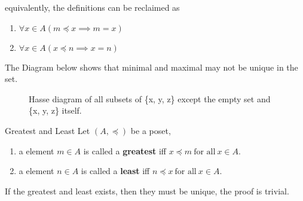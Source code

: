 \begin{remarks}
    equivalently, the definitions can be reclaimed as
    \begin{enumerate}

        \item $\forall x \in A (m \preceq x \implies m = x)$
        \item $\forall x \in A (x \preceq n \implies x = n)$

    \end{enumerate}
\end{remarks}

\begin{examples}
    The Diagram below shows that minimal and maximal may not be
    unique in the set.
\end{examples}

\begin{figure}[ht]
    \centering
    \caption{Hasse diagram of all subsets of \{x, y, z\} except the
    empty set and \{x, y, z\} itself.}
\end{figure}

\begin{definition}{Greatest and Least}{}
    Let $(A,\preceq)$ be a poset,
    \begin{enumerate}

        \item a element $m \in A$ is called a \textbf{greatest} iff $x
            \preceq m \ \text{for all}\ x \in A$.
        \item a element $n \in A$ is called a \textbf{least} iff $n
            \preceq x \ \text{for all}\ x \in A$.

    \end{enumerate}

\end{definition}

\begin{remarks}
    If the greatest and least exists, then they must be unique, the
    proof is trivial.
\end{remarks}

